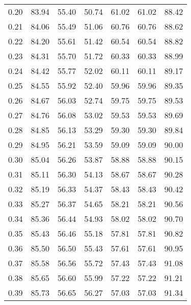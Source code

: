 \begin{tabular}{|c|c|c|c|c|c|c|}
      0.20 &     83.94 &     55.40 &      50.74 &   61.02 &      61.02 &         88.42 \\
      0.21 &     84.06 &     55.49 &      51.06 &   60.76 &      60.76 &         88.62 \\
      0.22 &     84.20 &     55.61 &      51.42 &   60.54 &      60.54 &         88.82 \\
      0.23 &     84.31 &     55.70 &      51.72 &   60.33 &      60.33 &         88.99 \\
      0.24 &     84.42 &     55.77 &      52.02 &   60.11 &      60.11 &         89.17 \\
      0.25 &     84.55 &     55.92 &      52.40 &   59.96 &      59.96 &         89.35 \\
      0.26 &     84.67 &     56.03 &      52.74 &   59.75 &      59.75 &         89.53 \\
      0.27 &     84.76 &     56.08 &      53.02 &   59.53 &      59.53 &         89.69 \\
      0.28 &     84.85 &     56.13 &      53.29 &   59.30 &      59.30 &         89.84 \\
      0.29 &     84.95 &     56.21 &      53.59 &   59.09 &      59.09 &         90.00 \\
      0.30 &     85.04 &     56.26 &      53.87 &   58.88 &      58.88 &         90.15 \\
      0.31 &     85.11 &     56.30 &      54.13 &   58.67 &      58.67 &         90.28 \\
      0.32 &     85.19 &     56.33 &      54.37 &   58.43 &      58.43 &         90.42 \\
      0.33 &     85.27 &     56.37 &      54.65 &   58.21 &      58.21 &         90.56 \\
      0.34 &     85.36 &     56.44 &      54.93 &   58.02 &      58.02 &         90.70 \\
      0.35 &     85.43 &     56.46 &      55.18 &   57.81 &      57.81 &         90.82 \\
      0.36 &     85.50 &     56.50 &      55.43 &   57.61 &      57.61 &         90.95 \\
      0.37 &     85.58 &     56.56 &      55.72 &   57.43 &      57.43 &         91.08 \\
      0.38 &     85.65 &     56.60 &      55.99 &   57.22 &      57.22 &         91.21 \\
      0.39 &     85.73 &     56.65 &      56.27 &   57.03 &      57.03 &         91.34 \\

\end{tabular}
